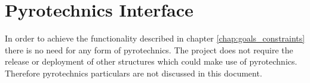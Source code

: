 \chapter{Pyrotechnics Interface}
\label{chap:pyro}
%
%
In order to achieve the functionality described in chapter \ref{chap:goals_constraints} there is no need for any form of pyrotechnics. The project does not require the release or deployment of other structures which could make use of pyrotechnics. Therefore pyrotechnics particulars are not discussed in this document.
%